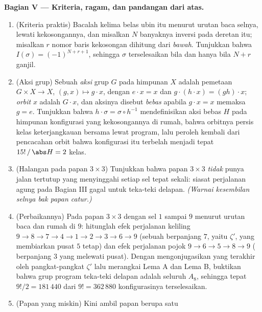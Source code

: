 \begin{problem}
\medskip
\noindent\textbf{Bagian V --- Kriteria, ragam, dan pandangan
dari atas.}
\begin{enumerate}[resume]
  \item (Kriteria praktis) Bacalah kelima belas ubin itu menurut urutan
        baca selnya, lewati kekosongannya, dan misalkan
        $N$ banyaknya inversi pada deretan itu; misalkan $r$ nomor
        baris kekosongan dihitung dari \emph{bawah}. Tunjukkan
        bahwa $I(\sigma) = (-1)^{N + r + 1}$, sehingga $\sigma$
        terselesaikan bila dan hanya bila $N + r$ ganjil.
  \item (Aksi grup) Sebuah \emph{aksi} grup $G$ pada himpunan
        $X$ adalah pemetaan $G \times X \to X$, $(g, x) \mapsto g \cdot
        x$, dengan $e \cdot x = x$ dan $g \cdot (h \cdot x) =
        (gh) \cdot x$; \emph{orbit} $x$ adalah $G \cdot x$, dan
        aksinya disebut \emph{bebas} apabila $g \cdot x = x$ memaksa $g =
        e$. Tunjukkan bahwa $h \cdot \sigma = \sigma \circ h^{-1}$
        mendefinisikan aksi bebas $H$ pada himpunan konfigurasi yang
        kekosongannya di rumah, bahwa orbitnya persis kelas
        keterjangkauan bersama lewat program, lalu peroleh kembali dari
        pencacahan orbit bahwa konfigurasi itu terbelah menjadi tepat
        $15!\,/\,\abs H = 2$ kelas.
  \item (Halangan pada papan $3 \times 3$) Tunjukkan bahwa papan
        $3 \times 3$ \emph{tidak} punya jalan tertutup yang menyinggahi
        setiap sel tepat sekali: siasat perjalanan agung pada Bagian III
        gagal untuk teka-teki delapan. \emph{(Warnai kesembilan
        selnya bak papan catur.)}
  \item (Perbaikannya) Pada papan $3 \times 3$ dengan sel $1$ sampai
        $9$ menurut urutan baca dan rumah di $9$: hitunglah efek
        perjalanan keliling $9 \to 8 \to 7 \to 4 \to 1 \to 2 \to 3
        \to 6 \to 9$ (sebuah  berpanjang $7$, yaitu $\zeta'$, yang
        membiarkan pusat $5$ tetap) dan efek perjalanan pojok $9 \to 6
        \to 5 \to 8 \to 9$ ( berpanjang $3$ yang melewati pusat).
        Dengan mengonjugasikan yang terakhir oleh pangkat-pangkat
        $\zeta'$ lalu merangkai Lema A dan Lema B, buktikan
        bahwa grup program teka-teki delapan adalah seluruh $A_8$,
        sehingga tepat $9!/2 = 181\,440$ dari $9! =
        362\,880$ konfigurasinya terselesaikan.
  \item (Papan yang miskin) Kini ambil papan berupa satu 

\end{enumerate}
\end{problem}
